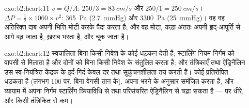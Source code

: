 \begin{solution}{exo:b2:heart:11}
$v = Q/A$: $250/3 = \qty{83}{cm/s}$ और $250/1 = \qty{250}{cm/s}$।
$\Delta P = \tfrac12\times 1060\times v^{2}$: \qty{365}{Pa}
(\qty{2.7}{mmHg}) और \qty{3300}{Pa} (\qty{25}{mmHg})। वह 
वह अतिरिक्त दाब अपनी भित्ति मोटी करके पैदा करता है; और वह मोटा,
कड़ा  अंततः अपनी हृद्-आपूर्ति से आगे बढ़ जाता है, ख़राब
भरता है, और चूक जाता है।
\end{solution}

\begin{solution}{exo:b2:heart:12}
स्वचालिता बिना किसी निवेश के कोई धड़कन देती है; स्टार्लिंग नियम
निर्गम को वापसी से मिलाता है और दोनों  को बिना
किसी निवेश के संतुलित करता है; और तंत्रिकाएँ तथा ऐड्रिनैलिन उस
स्व-नियंत्रित केंद्रक के इर्द-गिर्द केवल दर तथा सुकुंचनशीलता तय करती हैं। कोई प्रतिरोपित
 धड़कता है (लगभग 100 पर, बिना वेगसी तान के), अपना
 भरने के अनुसार समंजित करता है, और व्यायाम में अपना निर्गम
स्टार्लिंग क्रियाविधि से तथा परिसंचरित ऐड्रिनैलिन से चढ़ा सकता है --- पर धीरे,
और किसी तंत्रिकित  से कम।
\end{solution}

